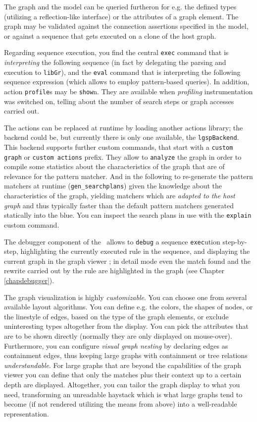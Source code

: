 The graph and the model can be queried furtheron for e.g. the defined types (utilizing a reflection-like interface) or the attributes of a graph element.
The graph may be validated against the connection assertions specified in the model, or against a sequence that gets executed on a clone of the host graph.

Regarding sequence execution, you find the central \texttt{exec} command that is \emph{interpreting} the following sequence (in fact by delegating the parsing and execution to \texttt{libGr}), and the \texttt{eval} command that is interpreting the following sequence expression (which allows to employ pattern-based queries).
In addition, action \texttt{profile}s may be \texttt{show}n.
They are available when \emph{profiling} instrumentation was switched on, telling about the number of search steps or graph accesses carried out.

The actions can be replaced at runtime by loading another actions library; the backend could be, but currently there is only one available, the \texttt{lgspBackend}.
This backend supports further custom commands, that start with a \texttt{custom graph} or \texttt{custom actions} prefix. 
They allow to \texttt{analyze} the graph in order to compile some statistics about the characteristics of the graph that are of relevance for the pattern matcher.
And in the following to re-generate the pattern matchers at runtime (\texttt{gen\_searchplans}) given the knowledge about the characteristics of the graph, yielding matchers which are \emph{adapted to the host graph} and thus typically faster than the default pattern matchers generated statically into the blue.
You can inspect the search plans in use with the \texttt{explain} custom command.

The debugger component of the \GrShell\ allows to \texttt{debug} a sequence \texttt{exec}ution step-by-step, highlighting the currently executed rule in the sequence, and displaying the current graph in the graph viewer \yComp;
in detail mode even the match found and the rewrite carried out by the rule are highlighted in the graph (see Chapter \ref{chapdebugger}).

The graph visualization is highly \emph{customizable}.
You can choose one from several available layout algorithms.
You can define e.g. the colors, the shapes of nodes, or the linestyle of edges, based on the type of the graph elements,
or exclude uninteresting types altogether from the display.
You can pick the attributes that are to be shown directly (normally they are only displayed on mouse-over).
Furthermore, you can configure \emph{visual graph nesting} by declaring edges as containment edges, thus keeping large graphs with containment or tree relations \emph{understandable}.
For large graphs that are beyond the capabilities of the graph viewer you can define that only the matches plus their context up to a certain depth are displayed.
Altogether, you can tailor the graph display to what you need, transforming an unreadable haystack which is what large graphs tend to become (if not rendered utilizing the means from above) into a well-readable representation.

